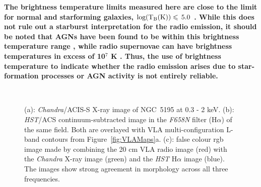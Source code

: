 \documentclass[fleqn,usenatbib]{mnras}
\def\fig{Figure}
\begin{document}
\textbf{The brightness temperature limits measured here are close to the limit for normal and starforming galaxies,  ${\rm log(T_{B} (K))}\leq\,5.0$ \citep{Condon1992}.
While this does not rule out a starburst interpretation for the radio emission, it should be noted that AGNs have been found to be within this brightness temperature range \citep{Garrett2001}, while radio supernovae can have brightness temperatures in excess of 10$^7$ K \citep{Smithetal1998}.  Thus, the use of brightness temperature to indicate whether the radio emission arises due to star-formation processes  or  AGN  activity is not entirely reliable.}




\begin{figure}
{\centering
{} \hspace{2em}
\\

\caption{(a): \textit{Chandra}/ACIS-S X-ray image of NGC~5195 at 0.3 - 2 keV. (b): \textit{HST}/ACS continuum-subtracted image in the \textit{F658N} filter (H$\alpha$) of the same field. Both are overlayed with VLA multi-configuration L-band contours from \fig~\ref{fig:VLAMaps}a. (c): false colour rgb image made by combining the 20 cm VLA radio image (red) with the \textit{Chandra} X-ray image (green) and the \textit{HST} H$\alpha$ image (blue). The images show strong agreement in morphology across all three frequencies.}
\label{fig:VLAHalpha}
}
\end{figure}
\end{document}
